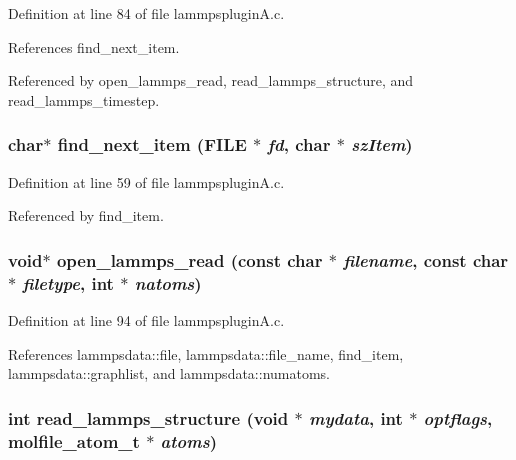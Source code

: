 Definition at line 84 of file lammpsplugin\-A.c.

References find\_\-next\_\-item.

Referenced by open\_\-lammps\_\-read, read\_\-lammps\_\-structure, and read\_\-lammps\_\-timestep.
\subsubsection{\setlength{\rightskip}{0pt plus 5cm}char$\ast$ find\_\-next\_\-item (FILE $\ast$ {\em fd}, char $\ast$ {\em sz\-Item})\hspace{0.3cm}{\tt  [static]}}\label{lammpspluginA_8c_a2}




Definition at line 59 of file lammpsplugin\-A.c.

Referenced by find\_\-item.
\subsubsection{\setlength{\rightskip}{0pt plus 5cm}void$\ast$ open\_\-lammps\_\-read (const char $\ast$ {\em filename}, const char $\ast$ {\em filetype}, int $\ast$ {\em natoms})\hspace{0.3cm}{\tt  [static]}}\label{lammpspluginA_8c_a4}




Definition at line 94 of file lammpsplugin\-A.c.

References lammpsdata::file, lammpsdata::file\_\-name, find\_\-item, lammpsdata::graphlist, and lammpsdata::numatoms.
\subsubsection{\setlength{\rightskip}{0pt plus 5cm}int read\_\-lammps\_\-structure (void $\ast$ {\em mydata}, int $\ast$ {\em optflags}, {\bf molfile\_\-atom\_\-t} $\ast$ {\em atoms})\hspace{0.3cm}{\tt  [static]}}\label{lammpspluginA_8c_a5}




